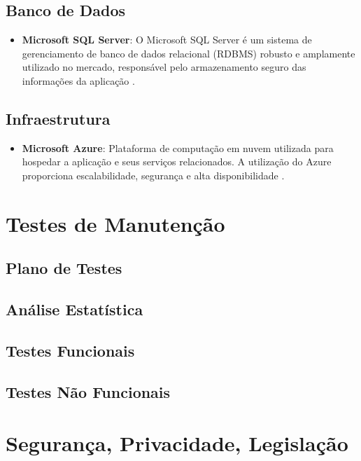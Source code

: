 \documentclass[
	12pt,				%
	openright,			%
	twoside,			%
	a4paper,			%
	english,			%
	french,				%
	spanish,			%
	brazil				%
	]{abntex2}
\begin{document}
\subsection{Banco de Dados}

\begin{itemize}
    \item \textbf{Microsoft SQL Server}: O Microsoft SQL Server é um sistema de gerenciamento de banco de dados relacional (RDBMS) robusto e amplamente utilizado no mercado, responsável pelo armazenamento seguro das informações da aplicação \cite{SqlServer2025}.


\end{itemize}

\subsection{Infraestrutura}

\begin{itemize}
    \item \textbf{Microsoft Azure}: Plataforma de computação em nuvem utilizada para hospedar a aplicação e seus serviços relacionados. A utilização do Azure proporciona escalabilidade, segurança e alta disponibilidade \cite{Azure2025}.
\end{itemize}



\section{Testes de Manutenção}

\subsection{Plano de Testes}

\subsection{Análise Estatística}

\subsection{Testes Funcionais}

\subsection{Testes Não Funcionais}


\section{Segurança, Privacidade, Legislação}
\end{document}
